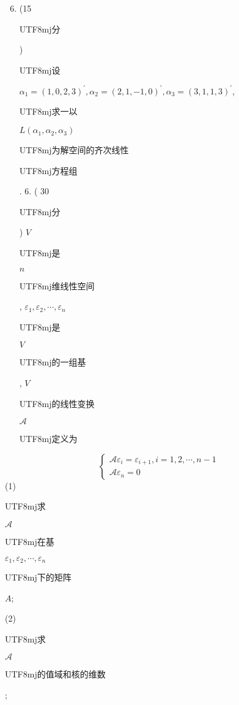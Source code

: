 \documentclass[10pt]{article}
\begin{document}
\begin{enumerate}
  \setcounter{enumi}{5}
  \item (15 \begin{CJK}{UTF8}{mj}分\end{CJK}) \begin{CJK}{UTF8}{mj}设\end{CJK} $\alpha_{1}=(1,0,2,3)^{\prime}, \alpha_{2}=(2,1,-1,0)^{\prime}, \alpha_{3}=(3,1,1,3)^{\prime}$, \begin{CJK}{UTF8}{mj}求一以\end{CJK} $L\left(\alpha_{1}, \alpha_{2}, \alpha_{3}\right)$ \begin{CJK}{UTF8}{mj}为解空间的齐次线性\end{CJK} \begin{CJK}{UTF8}{mj}方程组\end{CJK}. 6. ( 30 \begin{CJK}{UTF8}{mj}分\end{CJK}) $V$ \begin{CJK}{UTF8}{mj}是\end{CJK} $n$ \begin{CJK}{UTF8}{mj}维线性空间\end{CJK}, $\varepsilon_{1}, \varepsilon_{2}, \cdots, \varepsilon_{n}$ \begin{CJK}{UTF8}{mj}是\end{CJK} $V$ \begin{CJK}{UTF8}{mj}的一组基\end{CJK}, $V$ \begin{CJK}{UTF8}{mj}的线性变换\end{CJK} $\mathscr{A}$ \begin{CJK}{UTF8}{mj}定义为\end{CJK}
\end{enumerate}
$$
\left\{\begin{array}{l}
\mathscr{A} \varepsilon_{i}=\varepsilon_{i+1}, i=1,2, \cdots, n-1 \\
\mathscr{A} \varepsilon_{n}=0
\end{array}\right.
$$
(1) \begin{CJK}{UTF8}{mj}求\end{CJK} $\mathscr{A}$ \begin{CJK}{UTF8}{mj}在基\end{CJK} $\varepsilon_{1}, \varepsilon_{2}, \cdots, \varepsilon_{n}$ \begin{CJK}{UTF8}{mj}下的矩阵\end{CJK} $A$;

(2) \begin{CJK}{UTF8}{mj}求\end{CJK} $\mathscr{A}$ \begin{CJK}{UTF8}{mj}的值域和核的维数\end{CJK};
\end{document}
